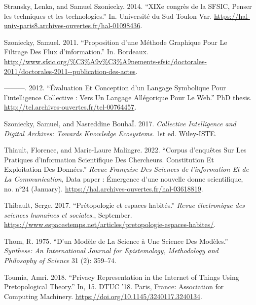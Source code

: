 \documentclass[
  letterpaper,
  DIV=11,
  numbers=noendperiod]{scrreprt}
\newlength{\cslhangindent}
\newlength{\cslentryspacingunit} %
\newenvironment{CSLReferences}[2] %
 {%
  \setlength{\parindent}{0pt}
  \ifodd #1
  \let\oldpar\par
  \def\par{\hangindent=\cslhangindent\oldpar}
  \fi
  \setlength{\parskip}{#2\cslentryspacingunit}
 }%
 {}
\begin{document}
\begin{CSLReferences}{1}{0}
\leavevmode{}%
Stransky, Lenka, and Samuel Szoniecky. 2014. {``XIXe congrès de la
SFSIC, Penser les techniques et les technologies.''} In. Université du
Sud Toulon Var.
\url{https://hal-univ-paris8.archives-ouvertes.fr/hal-01098436}.

\leavevmode{}%
Szoniecky, Samuel. 2011. {``Proposition d'une Méthode Graphique Pour Le
Filtrage Des Flux d'information.''} In. Bordeaux.
\url{http://www.sfsic.org/\%C3\%A9v\%C3\%A9nements-sfsic/doctorales-2011/doctorales-2011--publication-des-actes}.

\leavevmode{}%
---------. 2012. {``Évaluation Et Conception d'un Langage Symbolique
Pour l'intelligence Collective : Vers Un Langage Allégorique Pour Le
Web.''} PhD thesis. \url{http://tel.archives-ouvertes.fr/tel-00764457}.

\leavevmode{}%
Szoniecky, Samuel, and Nasreddine BouhaÏ. 2017. \emph{Collective
Intelligence and Digital Archives: Towards Knowledge Ecosystems}. 1st
ed. Wiley-ISTE.

\leavevmode{}%
Thiault, Florence, and Marie-Laure Malingre. 2022. {``Corpus d'enquêtes
Sur Les Pratiques d'information Scientifique Des Chercheurs.
Constitution Et Exploitation Des Données.''} \emph{Revue Française Des
Sciences de l'information Et de La Communication}, Data paper :
Émergence d'une nouvelle donne scientifique, no. n°24 (January).
\url{https://hal.archives-ouvertes.fr/hal-03618819}.

\leavevmode{}%
Thibault, Serge. 2017. {``Prétopologie et espaces habités.''}
\emph{Revue électronique des sciences humaines et sociales.}, September.
\url{https://www.espacestemps.net/articles/pretopologie-espaces-habites/}.

\leavevmode{}%
Thom, R. 1975. {``D'un Modèle de La Science à Une Science Des
Modèles.''} \emph{Synthese: An International Journal for Epistemology,
Methodology and Philosophy of Science} 31 (2): 359--74.

\leavevmode{}%
Toumia, Amri. 2018. {``Privacy Representation in the Internet of Things
Using Pretopological Theory.''} In, 15. DTUC '18. Paris, France:
Association for Computing Machinery.
\url{https://doi.org/10.1145/3240117.3240134}.


\end{CSLReferences}
\end{document}
